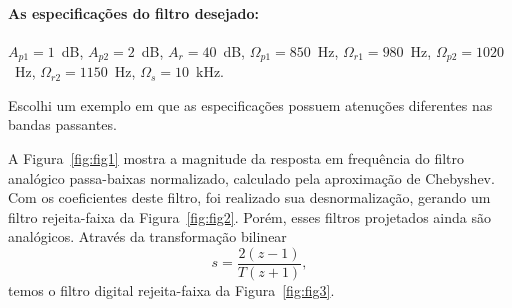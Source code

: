 \documentclass{homeworkclass}
\begin{document}
\begin{homeworkProblem}
	\paragraph{As especificações do filtro desejado:} $A_{p1} = 1$~dB, $A_{p2} = 2$~dB, $A_{r} = 40$~dB, $\Omega_{p1} = 850$~Hz, $\Omega_{r1} = 980$~Hz, $\Omega_{p2} = 1020$~Hz, $\Omega_{r2} = 1150$~Hz, $\Omega_{s} = 10$~kHz.
	
	Escolhi um exemplo em que as especificações possuem atenuções diferentes nas bandas passantes.
	
	\pagebreak
	A Figura~\ref{fig:fig1} mostra a magnitude da resposta em frequência do filtro analógico passa-baixas normalizado, calculado pela aproximação de Chebyshev. Com os coeficientes deste filtro, foi realizado sua desnormalização, gerando um filtro rejeita-faixa da Figura~\ref{fig:fig2}. Porém, esses filtros projetados ainda são analógicos. Através da transformação bilinear 
	\begin{equation*}
	s = \frac{2(z-1)}{T(z+1)},
	\end{equation*}
	temos o filtro digital rejeita-faixa da Figura~\ref{fig:fig3}.
	
	


\end{homeworkProblem}
\end{document}
